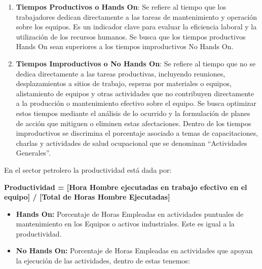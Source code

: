 \documentclass[
  11pt,
  bookmarksnumbered]{article}
\begin{document}
\begin{enumerate}
\def\labelenumi{\arabic{enumi}.}
\item
  \textbf{Tiempos Productivos o Hands On}: Se refiere al tiempo que los trabajadores dedican directamente a las tareas de mantenimiento y operación sobre los equipos.
  Es un indicador clave para evaluar la eficiencia laboral y la utilización de los recursos humanos.
  Se busca que los tiempos productivos Hands On sean superiores a los tiempos improductivos No Hands On.
\item
  \textbf{Tiempos Improductivos o No Hands On}: Se refiere al tiempo que no se dedica directamente a las tareas productivas, incluyendo reuniones, desplazamientos a sitios de trabajo, esperas por materiales o equipos, alistamiento de equipos y otras actividades que no contribuyen directamente a la producción o mantenimiento efectivo sobre el equipo.
  Se busca optimizar estos tiempos mediante el análisis de lo ocurrido y la formulación de planes de acción que mitiguen o eliminen estas afectaciones.
  Dentro de los tiempos improductivos se discrimina el porcentaje asociado a temas de capacitaciones, charlas y actividades de salud ocupacional que se denominan ``Actividades Generales''.
\end{enumerate}

En el sector petrolero la productividad está dada por:

\textbf{Productividad = {[}Hora Hombre ejecutadas en trabajo efectivo en el equipo{]} / {[}Total de Horas Hombre Ejecutadas{]}}

\begin{itemize}
\item
  \textbf{Hands On:} Porcentaje de Horas Empleadas en actividades puntuales de mantenimiento en los Equipos o activos industriales.
  Este es igual a la productividad.
\item
  \textbf{No Hands On:} Porcentaje de Horas Empleadas en actividades que apoyan la ejecución de las actividades, dentro de estas tenemos:
\end{itemize}
\end{document}
